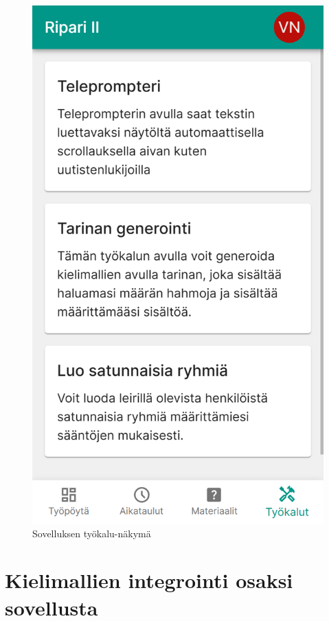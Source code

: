 \begin{figure}[h!]
\begin{minipage}[b]{.3\textwidth}
        \includegraphics[width=\textwidth]{figures/isosapp-tyokalut.png}
        \caption{Sovelluksen työkalu-näkymä}
        \label{fig:isosapp-tyokalut}
    \end{minipage}
\end{figure}

\clearpage
\section{Kielimallien integrointi osaksi sovellusta}

